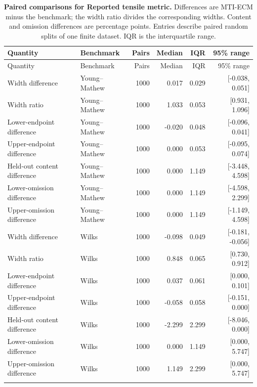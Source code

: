 \begingroup
\footnotesize
\setlength{\tabcolsep}{3pt}
\begin{longtable}{@{}llrrrr@{}}
\caption{\textbf{Paired comparisons for Reported tensile metric.} Differences are MTI-ECM minus the benchmark; the width ratio divides the corresponding widths. Content and omission differences are percentage points. Entries describe paired random splits of one finite dataset. IQR is the interquartile range.}\label{tab:supp-pharma-primary-paired}\\
\toprule
Quantity & Benchmark & Pairs & Median & IQR & 95\% range\\
\midrule
\endfirsthead
\toprule
Quantity & Benchmark & Pairs & Median & IQR & 95\% range\\
\midrule
\endhead
Width difference & Young--Mathew & 1000 & 0.017 & 0.029 & [-0.038, 0.051] \\
Width ratio & Young--Mathew & 1000 & 1.033 & 0.053 & [0.931, 1.096] \\
Lower-endpoint difference & Young--Mathew & 1000 & -0.020 & 0.048 & [-0.096, 0.041] \\
Upper-endpoint difference & Young--Mathew & 1000 & 0.000 & 0.053 & [-0.095, 0.074] \\
Held-out content difference & Young--Mathew & 1000 & 0.000 & 1.149 & [-3.448, 4.598] \\
Lower-omission difference & Young--Mathew & 1000 & 0.000 & 1.149 & [-4.598, 2.299] \\
Upper-omission difference & Young--Mathew & 1000 & 0.000 & 1.149 & [-1.149, 4.598] \\
\addlinespace
Width difference & Wilks & 1000 & -0.098 & 0.049 & [-0.181, -0.056] \\
Width ratio & Wilks & 1000 & 0.848 & 0.065 & [0.730, 0.912] \\
Lower-endpoint difference & Wilks & 1000 & 0.037 & 0.061 & [0.000, 0.101] \\
Upper-endpoint difference & Wilks & 1000 & -0.058 & 0.058 & [-0.151, 0.000] \\
Held-out content difference & Wilks & 1000 & -2.299 & 2.299 & [-8.046, 0.000] \\
Lower-omission difference & Wilks & 1000 & 0.000 & 1.149 & [0.000, 5.747] \\
Upper-omission difference & Wilks & 1000 & 1.149 & 2.299 & [0.000, 5.747] \\
\addlinespace
\bottomrule
\end{longtable}
\endgroup
